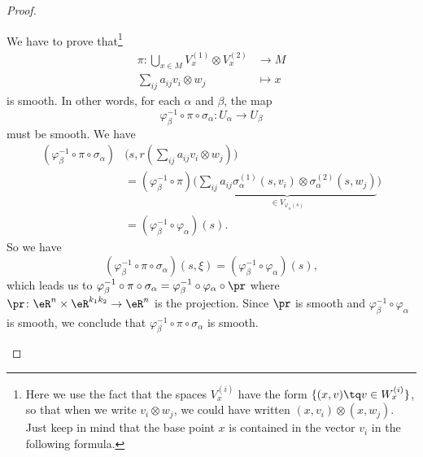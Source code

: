 \begin{proof}
\begin{subproof}
\begin{subproof}
		\end{subproof}
		We have to prove that\footnote{Here we use the fact that the spaces \( V_x^{(i)}\) have the form \( \{ (x,v)\tq v\in W_x^{(i)} \}\), so that when we write \( v_i\otimes w_j\), we could have written \( (x,v_i)\otimes (x,w_j)\). Just keep in mind that the base point \( x\) is contained in the vector \( v_i\) in the following formula.}
		\begin{equation}
			\begin{aligned}
				\pi\colon \bigcup_{x\in M}V_x^{(1)}\otimes V_x^{(2)} & \to M     \\
				\sum_{ij}a_{ij}v_i\otimes w_j                        & \mapsto x
			\end{aligned}
		\end{equation}
		is smooth. In other words, for each \( \alpha\) and \( \beta\), the map
		\begin{equation}
			\varphi_{\beta}^{-1}\circ \pi\circ \sigma_{\alpha} \colon U_{\alpha}\to U_{\beta}
		\end{equation}
		must be smooth. We have
		\begin{subequations}
			\begin{align}
				(\varphi_{\beta}^{-1}\circ\pi\circ\sigma_{\alpha}) & \big( s,r(\sum_{ij}a_{ij}v_i\otimes w_j) \big)                                                                                                                        \\
				                                                   & =(\varphi_{\beta}^{-1}\circ\pi)\Big( \underbrace{\sum_{ij}a_{ij}\sigma_{\alpha}^{(1)}(s,v_i)\otimes \sigma_{\alpha}^{(2)}(s,w_j)}_{\in V_{\varphi_{\alpha}(s)}} \Big) \\
				                                                   & =(\varphi_{\beta}^{-1}\circ\varphi_{\alpha})(s).
			\end{align}
		\end{subequations}
		So we have
		\begin{equation}
			(\varphi_{\beta}^{-1}\circ\pi\circ\sigma_{\alpha})(s,\xi)=(\varphi_{\beta}^{-1}\circ\varphi_{\alpha})(s),
		\end{equation}
		which leads us to \( \varphi_{\beta}^{-1}\circ\pi\circ\sigma_{\alpha}=\varphi_{\beta}^{-1}\circ\varphi_{\alpha}\circ\pr\) where \(\pr \colon \eR^n\times \eR^{k_1k_2}\to \eR^n  \) is the projection. Since \( \pr\) is smooth and \( \varphi_{\beta}^{-1}\circ\varphi_{\alpha}\) is smooth, we conclude that \( \varphi_{\beta}^{-1}\circ\pi\circ\sigma_{\alpha}\) is smooth.

\end{subproof}
\end{proof}
